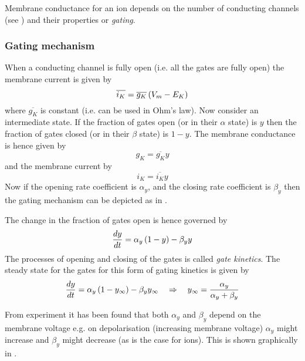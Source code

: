 Membrane conductance for an ion depends on the number of conducting channels
(see ) and their properties or \emph{gating}.

\subsubsection{Gating mechanism}

When a conducting channel is fully open (i.e. all the gates are fully open)
the membrane current is given by
\begin{equation}
  \overline{i_{K}}=\overline{g_{K}}\left( V_{m} - E_{K} \right)
\end{equation}
where $\overline{g_{K}}$ is constant (i.e. can be used in Ohm's law). Now
consider an intermediate state. If the fraction of gates open (or in their
$\alpha$ state) is $y$ then the fraction of gates closed (or in their
$\beta$ state) is $1-y$. The membrane conductance is hence given by
\begin{equation}
  g_{K}=\overline{g_{K}}y
\end{equation}
and the membrane current by
\begin{equation}
  i_{K}=\overline{i_{K}}y
\end{equation}
Now if the opening rate coefficient is $\alpha_{y}$, and the closing rate
coefficient is $\beta_{y}$ then the gating mechanism can be depicted as in
.


The change in the fraction of gates open is hence governed by
\begin{equation}
   \dfrac{ d y}{d t} =\alpha_{y}\left( 1-y \right)-\beta_{y}y
\end{equation}
The processes of opening and closing of the gates is called \emph{gate
  kinetics}. The steady state for the gates for this form of gating kinetics
is given by
\begin{equation}
   \dfrac{ d y}{d t} =\alpha_{y}\left( 1-y_{\infty} \right)-\beta_{y}y_{\infty}\quad
  \Rightarrow\quad y_{\infty}=\dfrac{\alpha_{y}}{\alpha_{y}+\beta_{y}}
\end{equation}

From experiment it has been found that both $\alpha_{y}$ and $\beta_{y}$
depend on the membrane voltage e.g. on depolarisation (increasing membrane
voltage) $\alpha_{y}$ might increase and $\beta_{y}$ might decrease (as is the
case for  ions). This is shown graphically in
.

